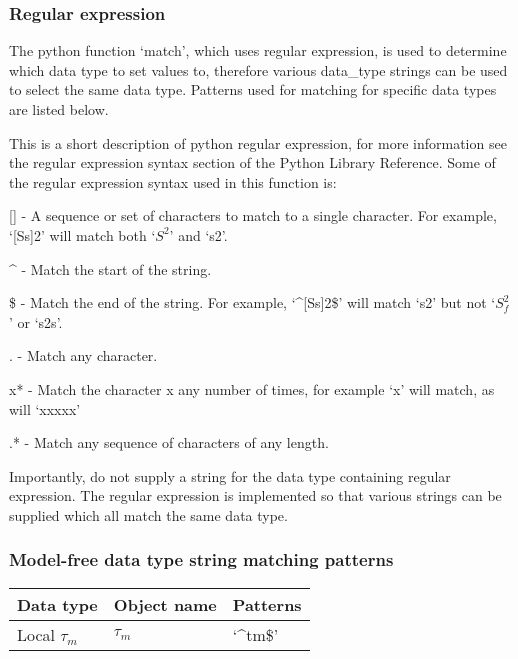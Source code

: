 




\subsubsection{Regular expression}

The python function `match', which uses regular expression, is used to determine which data
type to set values to, therefore various data\_type strings can be used to select the same
data type.  Patterns used for matching for specific data types are listed below.

This is a short description of python regular expression, for more information see the
regular expression syntax section of the Python Library Reference.  Some of the regular
expression syntax used in this function is:

    [] - A sequence or set of characters to match to a single character.  For example,
    `[Ss]2' will match both `$S^2$' and `s2'.

    \^{} - Match the start of the string.

    \$ - Match the end of the string.  For example, `\^{}[Ss]2\$' will match `s2' but not `$S^2_f$'
    or `s2s'.

    . - Match any character.

    x* - Match the character x any number of times, for example `x' will match, as will
    `xxxxx'

    .* - Match any sequence of characters of any length.

Importantly, do not supply a string for the data type containing regular expression.  The
regular expression is implemented so that various strings can be supplied which all match
the same data type.


\subsubsection{Model-free data type string matching patterns}



\begin{center}
\begin{tabular}{lll}
\toprule
Data type & Object name & Patterns \\
\midrule
 Local $\tau_m$                &  $\tau_m$            &  `\^{}tm\$'                                            \\
\bottomrule
\end{tabular}
\end{center}

